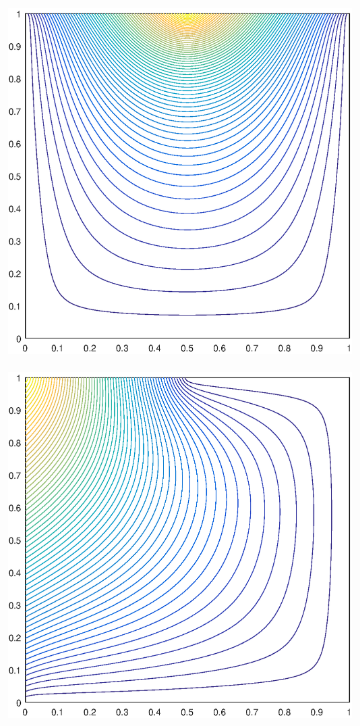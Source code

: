 \begin{figure}
\label{fig::2D_MV1_deg_square_basis_functions}
\centering
	\begin{subfigure}[b]{0.35\textwidth}
		\centering
		\includegraphics[width=\textwidth]{figures/sec_BF/deg_square_MV1_contour_b4.eps}
		\caption{}
	\end{subfigure}
	\vfill
	\begin{subfigure}[b]{0.35\textwidth}
		\centering
		\includegraphics[width=\textwidth]{figures/sec_BF/deg_square_MV1_contour_b5.eps}

\end{subfigure}
\end{figure}
